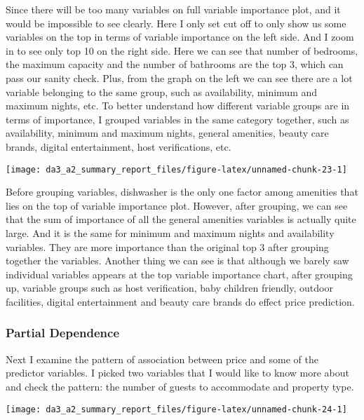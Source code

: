 \documentclass[
]{article}
\begin{document}
Since there will be too many variables on full variable importance plot,
and it would be impossible to see clearly. Here I only set cut off to
only show us some variables on the top in terms of variable importance
on the left side. And I zoom in to see only top 10 on the right side.
Here we can see that number of bedrooms, the maximum capacity and the
number of bathrooms are the top 3, which can pass our sanity check.
Plus, from the graph on the left we can see there are a lot variable
belonging to the same group, such as availability, minimum and maximum
nights, etc. To better understand how different variable groups are in
terms of importance, I grouped variables in the same category together,
such as availability, minimum and maximum nights, general amenities,
beauty care brands, digital entertainment, host verifications, etc.

\begin{center}\texttt{[image: da3\_a2\_summary\_report\_files/figure-latex/unnamed-chunk-23-1]} \end{center}

Before grouping variables, dishwasher is the only one factor among
amenities that lies on the top of variable importance plot. However,
after grouping, we can see that the sum of importance of all the general
amenities variables is actually quite large. And it is the same for
minimum and maximum nights and availability variables. They are more
importance than the original top 3 after grouping together the
variables. Another thing we can see is that although we barely saw
individual variables appears at the top variable importance chart, after
grouping up, variable groups such as host verification, baby children
friendly, outdoor facilities, digital entertainment and beauty care
brands do effect price prediction.

\hypertarget{partial-dependence}{%
\subsubsection{Partial Dependence}\label{partial-dependence}}

Next I examine the pattern of association between price and some of the
predictor variables. I picked two variables that I would like to know
more about and check the pattern: the number of guests to accommodate
and property type.

\begin{center}\texttt{[image: da3\_a2\_summary\_report\_files/figure-latex/unnamed-chunk-24-1]} \end{center}
\end{document}
